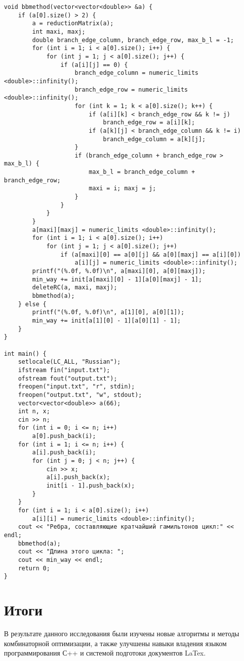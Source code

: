 \documentclass[a4paper, 12pt] {article}
\begin{document}
\begin{verbatim}
void bbmethod(vector<vector<double>> &a) {
    if (a[0].size() > 2) {
        a = reductionMatrix(a);
        int maxi, maxj;
        double branch_edge_column, branch_edge_row, max_b_l = -1;
        for (int i = 1; i < a[0].size(); i++) {
            for (int j = 1; j < a[0].size(); j++) {
                if (a[i][j] == 0) {
                    branch_edge_column = numeric_limits <double>::infinity();
                    branch_edge_row = numeric_limits <double>::infinity();
                    for (int k = 1; k < a[0].size(); k++) {
                        if (a[i][k] < branch_edge_row && k != j) 
                            branch_edge_row = a[i][k];
                        if (a[k][j] < branch_edge_column && k != i) 
                            branch_edge_column = a[k][j];
                    }
                    if (branch_edge_column + branch_edge_row > max_b_l) {
                        max_b_l = branch_edge_column + branch_edge_row;
                        maxi = i; maxj = j;
                    }
                }
            }
        }
        a[maxi][maxj] = numeric_limits <double>::infinity();
        for (int i = 1; i < a[0].size(); i++)
            for (int j = 1; j < a[0].size(); j++)
                if (a[maxi][0] == a[0][j] && a[0][maxj] == a[i][0])
                    a[i][j] = numeric_limits <double>::infinity();
        printf("(%.0f, %.0f)\n", a[maxi][0], a[0][maxj]);
        min_way += init[a[maxi][0] - 1][a[0][maxj] - 1];
        deleteRC(a, maxi, maxj);
        bbmethod(a);
    } else {
        printf("(%.0f, %.0f)\n", a[1][0], a[0][1]);
        min_way += init[a[1][0] - 1][a[0][1] - 1];
    }
}

int main() {
    setlocale(LC_ALL, "Russian");
    ifstream fin("input.txt");
    ofstream fout("output.txt");
    freopen("input.txt", "r", stdin);
    freopen("output.txt", "w", stdout);
    vector<vector<double>> a(66);
    int n, x;
    cin >> n;
    for (int i = 0; i <= n; i++)
        a[0].push_back(i);
    for (int i = 1; i <= n; i++) {
        a[i].push_back(i);
        for (int j = 0; j < n; j++) {
            cin >> x;
            a[i].push_back(x);
            init[i - 1].push_back(x);
        }
    }
    for (int i = 1; i < a[0].size(); i++)
        a[i][i] = numeric_limits <double>::infinity();
    cout << "Ребра, составляющие кратчайший гамильтонов цикл:" << endl;
    bbmethod(a);
    cout << "Длина этого цикла: ";
    cout << min_way << endl;
    return 0;
}
\end{verbatim}

\section*{Итоги}
В результате данного исследования были изучены новые алгоритмы и методы комбинаторной оптимизации, а также улучшены навыки владения языком программирования С++ и системой подготоки документов LaTex.
\end{document}
